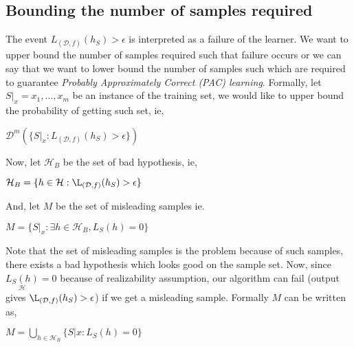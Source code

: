 \documentclass[a4paper]{article}
\begin{document}
            \subsection{Bounding the number of samples required}
            The event $L_{(\mathcal{D},f)}(h_S) > \epsilon$ is interpreted as a failure of the learner. We want to upper bound the number of samples required such that failure occurs or we can say that we want to lower bound the number of samples such which are required to guarantee \textit{Probably Approximately Correct (PAC) learning}. Formally, let $S|_x = {x_1,\dots,x_m}$ be an instance of the training set, we would like to upper bound the probability of getting such set, ie,
            \begin{center}
                $
                \mathcal{D}^{m}(\{S|_x : L_{(\mathcal{D},f)}(h_S) > \epsilon\})
                $
            \end{center}
            
            Now, let $\mathcal{H}_B$ be the set of bad hypothesis, ie,
            \begin{center}
                $\mathcal{H}_B = \{h \in \mathcal{H}: \L_{(\mathcal{D},f)}(h_S) > \epsilon\}$
            \end{center}
            And, let $M$ be the set of misleading samples ie.
            \begin{center}
                $
                M = \{S|_x:\exists h \in \mathcal{H}_B, L_S(h) = 0\}
                $
            \end{center}
            
            Note that the set of misleading samples is the problem because of such samples, there exists a bad hypothesis which looks good on the sample set.
            Now, since $\underset{\mathcal{H}}{L_S(h)} = 0$ because of realizability assumption, our algorithm can fail (output gives $\L_{(\mathcal{D},f)}(h_S) > \epsilon$) if we get a misleading sample. Formally $M$ can be written as,
            \begin{center}
                $
                    M = \underset{h\in\mathcal{H}_B}{\bigcup}\{S|x:L_S(h) = 0\}
                $
            \end{center}
        
\end{document}
